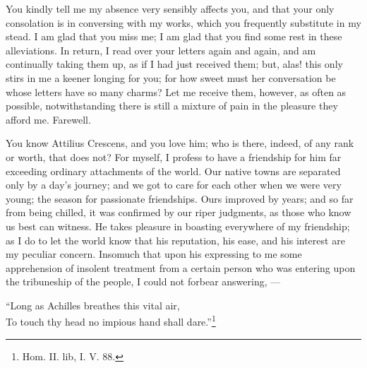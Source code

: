 
You kindly tell me my absence very sensibly affects you, and that your
only consolation is in conversing with my works, which you frequently
substitute in my stead. I am glad that you miss me; I am glad that you
find some rest in these alleviations. In return, I read over your letters
again and again, and am continually taking them up, as if I had just
received them; but, alas! this only stirs in me a keener longing for you;
for how sweet must her conversation be whose letters have so many charms?
Let me receive them, however, as often as possible, notwithstanding there
is still a mixture of pain in the pleasure they afford me. Farewell.


You know Attilius Crescens, and you love him; who is there, indeed, of any
rank or worth, that does not? For myself, I profess to have a friendship
for him far exceeding ordinary attachments of the world. Our native towns
are separated only by a day's journey; and we got to care for each other
when we were very young; the season for passionate friendships. Ours
improved by years; and so far from being chilled, it was confirmed by our
riper judgments, as those who know us best can witness. He takes pleasure
in boasting everywhere of my friendship; as I do to let the world know
that his reputation, his ease, and his interest are my peculiar concern.
Insomuch that upon his expressing to me some apprehension of insolent
treatment from a certain person who was entering upon the tribuneship of
the people, I could not forbear answering, —

``Long as Achilles breathes this vital air,\\
To touch thy head no impious hand shall dare.''\footnote{Hom. II. lib, I. V. 88.}

